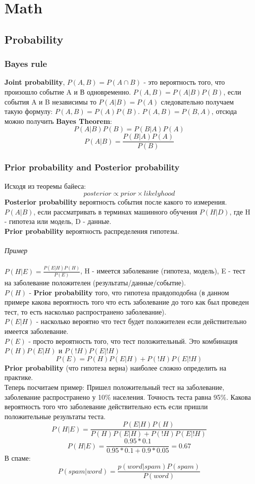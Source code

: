 \documentclass{book}
\begin{document}
\part{Math}
\chapter{Probability}
\section{Bayes rule}
\textbf{Joint probability}, $P(A, B)=P(A\cap B)$ - это вероятность того, что произошло событие A и В одновременно. $P(A, B) = P(A|B)P(B)$, если события A и B независимы то $P(A|B)=P(A)$ следовательно получаем такую формулу: $P(A, B)=P(A)P(B)$. $P(A, B)=P(B,A)$, отсюда можно получить \textbf{Bayes Theorem}: $$P(A|B)P(B)=P(B|A)P(A)$$ $$P(A|B)=\frac{P(B|A)P(A)}{P(B)}$$
\section{Prior probability and Posterior probability}
Исходя из теоремы байеса: $$posterior\propto prior \times likelyhood$$
\textbf{Posterior probability} вероятность события после какого то измерения. $P(A|B)$, если рассматривать в терминах машинного обучения $P(H|D)$, где H - гипотеза или модель, D - данные.\\
\textbf{Prior probability} вероятность распределения гипотезы.\\\\
\emph{Пример}\\\\
$ P(H|E) = \frac{P(E|H)P(H)}{P(E)} $, H - имеется заболевание (гипотеза, модель), E - тест на заболевание положителен (результаты/данные/событие).\\ $P(H)$ - \textbf{Prior probability} того, что гипотеза правдоподобна (в данном примере какова вероятность того что есть заболевание до того как был проведен тест, то есть насколько распространено заболевание).\\ $P(E|H)$ - насколько вероятно что тест будет положителен если действительно имеется заболевание.\\$P(E)$ - просто вероятность того, что тест положительный. Это комбинация  $P(H)P(E|H)$ и $P(!H)P(E|!H)$ $$ P(E)= P(H)P(E|H) + P(!H)P(E|!H)$$
\textbf{Prior probability} (что гипотеза верна) наиболее сложно определить на практике.\\
Теперь посчитаем пример:
Пришел положительный тест на заболевание, заболевание распространено у 10\% населения. Точность теста равна 95\%. Какова вероятность того что заболевание действительно есть если пришли положительные результаты теста.
$$P(H|E)=\frac{P(E|H)P(H)}{P(H)P(E|H) + P(!H)P(E|!H)}$$$$P(H|E)=\frac{0.95*0.1}{0.95*0.1+0.9*0.05}=0.67$$
В спаме:$$P(spam|word)=\frac{p(word|spam)P(spam)}{P(word)}$$
\end{document}
